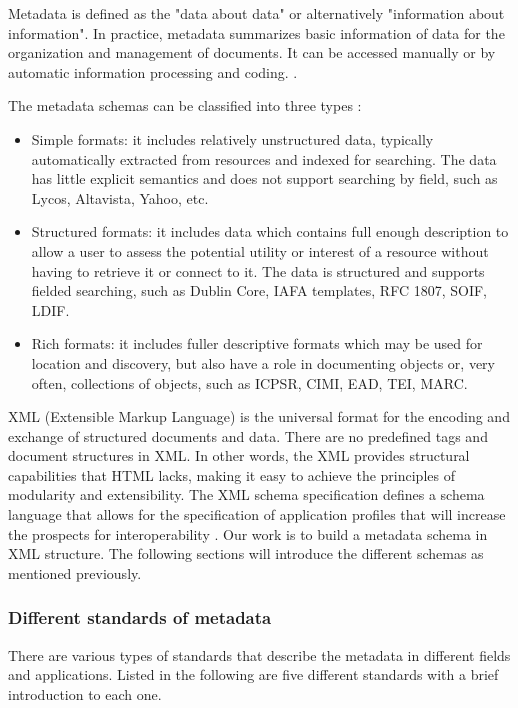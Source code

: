 Metadata is defined as the "data about data" or alternatively "information about information". 
In practice, metadata summarizes basic information of data for the organization and management of documents. 
It can be accessed manually or by automatic information processing and coding. \cite{underwood2003xml}.

The metadata schemas can be classified into three types \cite{dempsey1997specification}:
\begin{itemize}
	\item Simple formats: it includes relatively unstructured data, typically automatically extracted from resources and indexed for searching. 
	The data has little explicit semantics and does not support searching by field, such as Lycos, Altavista, Yahoo, etc.
	\item Structured formats: it includes data which contains full enough description to allow a user to assess the potential utility or interest of a resource without having to retrieve it or connect to it. 
	The data is structured and supports fielded searching, such as Dublin Core, IAFA templates, RFC 1807, SOIF, LDIF.
	\item Rich formats: it includes fuller descriptive formats which may be used for location and discovery, 
	but also have a role in documenting objects or, very often, collections of objects, such as ICPSR, CIMI, EAD, TEI, MARC.
\end{itemize}

XML (Extensible Markup Language) is the universal format for the encoding and exchange of structured documents and data. 
There are no predefined tags and document structures in XML. 
In other words, the XML provides structural capabilities that HTML lacks, making it easy to achieve the principles of modularity and extensibility. 
The XML schema specification defines a schema language that allows for the specification of application profiles that will increase the prospects for interoperability \cite{duval2002metadata}. 
Our work is to build a metadata schema in XML structure. The following sections will introduce the different schemas as mentioned previously.


\subsubsection*{Different standards of metadata}
\label{sec:mets}
There are various types of standards that describe the metadata in different fields and applications. 
Listed in the following are five different standards with a brief introduction to each one.

